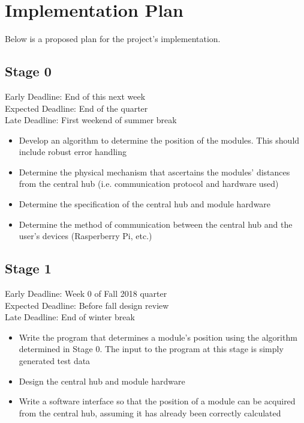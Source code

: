 \documentclass{article}
\begin{document}
\section{Implementation Plan}
Below is a proposed plan for the project's implementation.
\subsection{Stage 0}
Early Deadline: End of this next week \\
Expected Deadline: End of the quarter \\
Late Deadline: First weekend of summer break \\
\begin{itemize}
\item Develop an algorithm to determine the position of the modules. This should include robust error handling
\item Determine the physical mechanism that ascertains the modules' distances from the central hub (i.e. communication protocol and hardware used)
\item Determine the specification of the central hub and module hardware
\item Determine the method of communication between the central hub and the user's devices (Rasperberry Pi, etc.)
\end{itemize}

\subsection{Stage 1}
Early Deadline: Week 0 of Fall 2018 quarter \\
Expected Deadline: Before fall design review \\
Late Deadline: End of winter break \\
\begin{itemize}
\item Write the program that determines a module's position using the algorithm determined in Stage 0. The input to the program at this stage is simply generated test data \\
\item Design the central hub and module hardware \\
\item Write a software interface so that the position of a module can be acquired from the central hub, assuming it has already been correctly calculated
\end{itemize}
\end{document}
